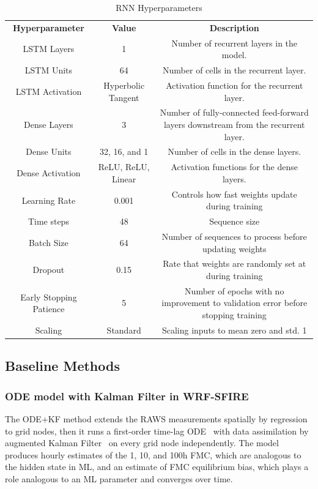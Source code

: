 \documentclass[fire,article,submit,pdftex,moreauthors]{Definitions/mdpi}
\begin{document}
\begin{table}[tbh]
\small
\caption{RNN Hyperparameters \label{tab:rnn_params}}
\begin{tabularx}{\textwidth}{CCC}
\toprule
\textbf{Hyperparameter} & \textbf{Value} & \textbf{Description} \\
LSTM Layers & 1 & Number of recurrent layers in the model.\\
\midrule
LSTM Units & 64 & Number of cells in the recurrent layer.\\
\midrule
LSTM Activation & Hyperbolic Tangent & Activation function for the recurrent layer.\\
\midrule
Dense Layers & 3 & Number of fully-connected feed-forward layers downstream from the recurrent layer.\\
\midrule
Dense Units & 32, 16, and 1 & Number of cells in the dense layers.\\
\midrule
Dense Activation & ReLU, ReLU, Linear & Activation functions for the dense layers.\\
\midrule
Learning Rate & 0.001 & Controls how fast weights update during training \\
\midrule
Time steps & 48 & 
Sequence size\\
\midrule
Batch Size & 64 & Number of sequences to process before updating weights \\
\midrule
Dropout & 0.15 & Rate that weights are randomly set at during training \\
\midrule
Early Stopping Patience & 5 & Number of epochs with no improvement to validation error before stopping training \\
\midrule
Scaling & Standard & Scaling inputs to mean zero and std. 1 \\
\bottomrule
\end{tabularx}
\end{table}

\subsection{Baseline Methods}
\label{subsec:baseline}

\subsubsection{ODE model with Kalman Filter in WRF-SFIRE}
\label{sec:ODE_KF}

The ODE+KF method extends the RAWS measurements spatially by regression to grid nodes, then it runs a first-order time-lag ODE~\citep{Mandel-2014-RAA} with data assimilation by augmented Kalman Filter~\citep{Vejmelka-2016-DAD} on every grid node independently. The model produces hourly estimates of the 1, 10, and 100h FMC, which are analogous to the hidden state in ML, and an estimate of FMC equilibrium bias, which plays a role analogous to an ML parameter and converges over time.
\end{document}
